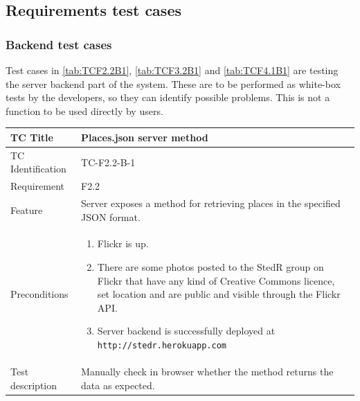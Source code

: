 \documentclass[11pt]{book}
\begin{document}
\subsection{Requirements test cases}

\subsubsection{Backend test cases}

Test cases in \ref{tab:TCF2.2B1}, \ref{tab:TCF3.2B1} and \ref{tab:TCF4.1B1} are testing the server backend part of the system. These are to be performed as white-box tests by the developers, so they can identify possible problems. This is not a function to be used directly by users.

\begin{table}
  \begin{tabular}{| p{3cm} | p{9.5cm} |} \hline 
    TC Title              & Places.json server method \\ \hline 
    TC Identification     & TC-F2.2-B-1 \\ \hline 
    Requirement           & F2.2 \\ \hline 
    Feature               & Server exposes a method for retrieving places in the specified JSON format. \\ \hline 
    Preconditions         & \begin{enumerate}
                              \item Flickr is up.
                              \item There are some photos posted to the StedR group on Flickr that have any kind of
                               Creative Commons licence, set location and are public and visible through the Flickr API.
                              \item Server backend is successfully deployed at \texttt{http://stedr.herokuapp.com}
                            \end{enumerate} \\ \hline 

    Test description      & Manually check in browser whether the method returns the data as expected.


\end{tabular}
\end{table}
\end{document}
